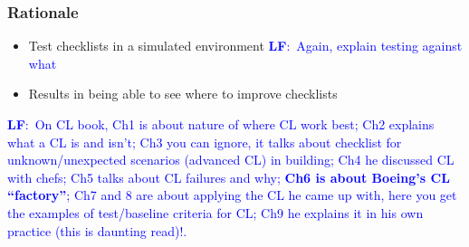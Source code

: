 \documentclass[a4paper]{article}
\newcommand{\lfcomment}[1]{\textcolor{blue}{\textbf{LF}:~#1}}
\begin{document}
\subsubsection*{Rationale}
\begin{itemize}
    \item Test checklists in a simulated environment \lfcomment{Again, explain testing against what}
    \item Results in being able to see where to improve checklists
\end{itemize}

\lfcomment{On CL book, Ch1 is about nature of where CL work best; Ch2 explains what a CL is and isn't; Ch3 you can ignore, it talks about checklist for unknown/unexpected scenarios (advanced CL) in building; Ch4 he discussed CL with chefs; Ch5 talks about CL failures and why; \textbf{Ch6 is about Boeing's CL ``factory''}; Ch7 and 8 are about applying the CL he came up with, here you get the examples of test/baseline criteria for CL; Ch9 he explains it in his own practice (this is daunting read)!.}
\end{document}
